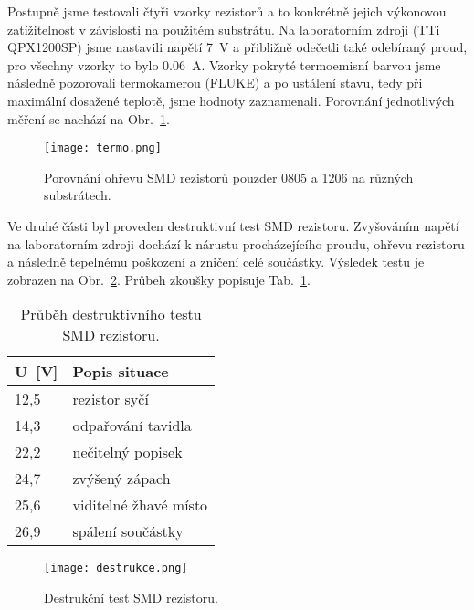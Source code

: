 Postupně jsme testovali čtyři vzorky rezistorů a to konkrétně jejich výkonovou zatížitelnost v závislosti na použitém substrátu. Na laboratorním zdroji (TTi QPX1200SP) jsme nastavili napětí \qty{7}{V} a přibližně odečetli také odebíraný proud, pro všechny vzorky to bylo \qty{0,06}{A}. Vzorky pokryté termoemisní barvou jsme následně pozorovali termokamerou (FLUKE) a po ustálení stavu, tedy při maximální dosažené teplotě, jsme hodnoty zaznamenali. Porovnání jednotlivých měření se nachází na Obr.~\ref{fig:termo-png}.

\begin{figure}[h!]
    \centering
    \texttt{[image: termo.png]}
    \caption{Porovnání ohřevu SMD rezistorů pouzder 0805 a 1206 na různých substrátech.}
    \label{fig:termo-png}
\end{figure}

Ve druhé části byl proveden destruktivní test SMD rezistoru. Zvyšováním napětí na laboratorním zdroji dochází k nárustu procházejícího proudu, ohřevu rezistoru a následně tepelnému poškození a zničení celé součástky. Výsledek testu je zobrazen na Obr.~\ref{fig:destrukce-png}. Průbeh zkoušky popisuje Tab.~\ref{tab:popis_destrukce}.

\begin{table}[h!]
    \caption{Průběh destruktivního testu SMD rezistoru.}
    \centering
    \def\arraystretch{1.4}
    \begin{tabular}{l|l}
        U\ [V] &  Popis situace \\ \hline  \hline
            12,5 &  rezistor syčí \\ \hline
            14,3 &  odpařování tavidla \\ \hline
            22,2 &  nečitelný popisek \\ \hline
            24,7 &  zvýšený zápach \\    \hline
            25,6 &  viditelné žhavé místo \\ \hline
            26,9 &   spálení součástky \\ 
    \end{tabular}
    \label{tab:popis_destrukce}
\end{table}


\begin{figure}[h!]
    \centering
    \texttt{[image: destrukce.png]}
    \caption{Destrukční test SMD rezistoru.}
    \label{fig:destrukce-png}
\end{figure}

